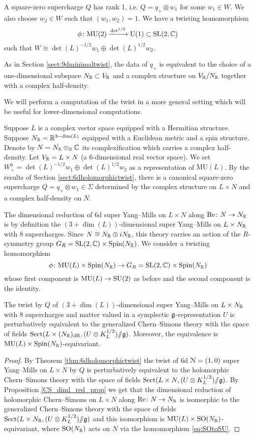 \documentclass[10pt, oneside]{article}
\newcommand{\MU}{\mathrm{MU}}
\renewcommand{\Re}{\mathrm{Re}}
\newcommand{\Sect}{\mathrm{Sect}}
\renewcommand{\U}{\mathrm{U}}
\newcommand{\ham}{/\!\!/}
\begin{document}
A square-zero supercharge $Q$ has rank 1, i.e. $Q=q_+\otimes w_1$ for some $w_1\in W$. We also choose $w_2\in W$ such that $(w_1, w_2) = 1$. We have a twisting homomorphism
\[\phi\colon\MU(2)\xrightarrow{\det^{1/2}}\U(1)\subset \SL(2, \CC)\]
such that $W\cong \det(L)^{-1/2} w_1\oplus \det(L)^{1/2} w_2$.

As in Section \ref{sect:9dminimaltwist}, the data of $q_+$ is equivalent to the choice of a one-dimensional subspace $N_\mathbb R\subset V_\mathbb R$ and a complex structure on $V_\mathbb R/N_\mathbb R$ together with a complex half-density.

We will perform a computation of the twist in a more general setting which will be useful for lower-dimensional computations.

Suppose $L$ is a complex vector space equipped with a Hermitian structure. Suppose $N_\mathbb R=\mathbb R^{3-\dim(L)}$ equipped with a Euclidean metric and a spin structure. Denote by $N=N_\mathbb R\otimes_\mathbb R\mathbb C$ its complexification which carries a complex half-density. Let $V_\mathbb R=L\times N$ (a 6-dimensional real vector space). We set $W^6_+=\det(L)^{-1/2}w_1\oplus \det(L)^{1/2} w_2$ as a representation of $\MU(L)$. By the results of Section \ref{sect:6dholomorphictwist}, there is a canonical square-zero supercharge $Q=q_+\otimes w_1\in\Sigma$ determined by the complex structure on $L\times N$ and a complex half-density on $N$.

The dimensional reduction of 6d super Yang--Mills on $L\times N$ along $\Re\colon N\rightarrow N_\RR$ is by definition the $(3+\dim(L))$-dimensional super Yang--Mills on $L\times N_\mathbb R$ with 8 supercharges. Since $N\cong N_\mathbb R\oplus iN_\mathbb R$, this theory carries an action of the $R$-symmetry group $G_R=\mathrm{SL}(2, \mathbb C)\times \mathrm{Spin}(N_\mathbb R)$. We consider a twisting homomorphism
\[\phi\colon \MU(L)\times \Spin(N_\RR)\rightarrow G_R=\SL(2, \CC)\times \Spin(N_\RR)\]
whose first component is $\MU(L)\rightarrow \SU(2)$ as before and the second component is the identity.

\begin{theorem}
The twist by $Q$ of $(3+\dim(L))$-dimensional super Yang--Mills on $L\times N_\mathbb R$ with 8 supercharges and matter valued in a symplectic $\mathfrak g$-representation $U$ is perturbatively equivalent to the generalized Chern--Simons theory with the space of fields $\Sect(L\times (N_\RR)_{\mr{dR}}, (U\otimes K_L^{1/2})\ham \fg)$. Moreover, the equivalence is $\MU(L)\times \Spin(N_\RR)$-equivariant.
\label{thm:6dCSreduction}
\end{theorem}
\begin{proof}
By Theorem \ref{thm:6dholomorphictwist} the twist of 6d $\mathcal N=(1, 0)$ super Yang--Mills on $L\times N$ by $Q$ is perturbatively equivalent to the holomorphic Chern--Simons theory with the space of fields $\Sect(L\times N, (U\otimes K_L^{1/2})\ham \fg)$. By Proposition \ref{CS_diml_red_prop} we get that the dimensional reduction of holomorphic Chern--Simons on $L\times N$ along $\Re\colon N\rightarrow N_\RR$ is isomorphic to the generalized Chern--Simons theory with the space of fields $\Sect(L\times N_\RR, (U\otimes K_L^{1/2})\ham\fg)$ and this isomorphism is $\MU(L)\times \SO(N_\RR)$-equivariant, where $\mathrm{SO}(N_\mathbb R)$ acts on $N$ via the homomorphism \eqref{eq:SOtoSU}.
\end{proof}
\end{document}

